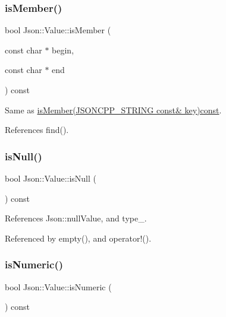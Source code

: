 \subsubsection{\texorpdfstring{is\+Member()}{isMember()}\hspace{0.1cm}{\footnotesize\ttfamily [3/3]}}
{\footnotesize\ttfamily bool Json\+::\+Value\+::is\+Member (\begin{DoxyParamCaption}\item[{const char $\ast$}]{begin,  }\item[{const char $\ast$}]{end }\end{DoxyParamCaption}) const}



Same as \hyperlink{classJson_1_1Value_a0c2cd838217b23ee6bde8135de1b30d9_a0c2cd838217b23ee6bde8135de1b30d9}{is\+Member(\+J\+S\+O\+N\+C\+P\+P\+\_\+\+S\+T\+R\+I\+N\+G const\& key)const}. 



References find().

\mbox{\label{classJson_1_1Value_abde4070e21e46dc4f8203f66582cb19f_abde4070e21e46dc4f8203f66582cb19f}} 
\subsubsection{\texorpdfstring{is\+Null()}{isNull()}}
{\footnotesize\ttfamily bool Json\+::\+Value\+::is\+Null (\begin{DoxyParamCaption}{ }\end{DoxyParamCaption}) const}



References Json\+::null\+Value, and type\+\_\+.



Referenced by empty(), and operator!().

\mbox{\label{classJson_1_1Value_af961a000cd203c895e44c195ab39b866_af961a000cd203c895e44c195ab39b866}} 
\subsubsection{\texorpdfstring{is\+Numeric()}{isNumeric()}}
{\footnotesize\ttfamily bool Json\+::\+Value\+::is\+Numeric (\begin{DoxyParamCaption}{ }\end{DoxyParamCaption}) const}



